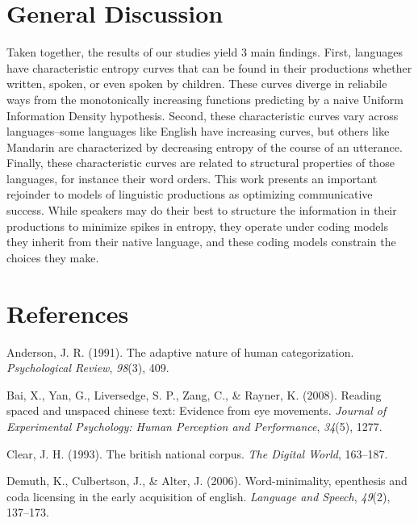 \documentclass[10pt, letterpaper]{article}
\begin{document}
\hypertarget{general-discussion}{%
\section{General Discussion}\label{general-discussion}}

Taken together, the results of our studies yield 3 main findings. First,
languages have characteristic entropy curves that can be found in their
productions whether written, spoken, or even spoken by children. These
curves diverge in reliabile ways from the monotonically increasing
functions predicting by a naive Uniform Information Density hypothesis.
Second, these characteristic curves vary across languages--some
languages like English have increasing curves, but others like Mandarin
are characterized by decreasing entropy of the course of an utterance.
Finally, these characteristic curves are related to structural
properties of those languages, for instance their word orders. This work
presents an important rejoinder to models of linguistic productions as
optimizing communicative success. While speakers may do their best to
structure the information in their productions to minimize spikes in
entropy, they operate under coding models they inherit from their native
language, and these coding models constrain the choices they make.

\hypertarget{references}{%
\section{References}\label{references}}

\setlength{\parindent}{-0.1in} 
\setlength{\leftskip}{0.125in}

\noindent

\hypertarget{refs}{}
\leavevmode\hypertarget{ref-anderson1991}{}%
Anderson, J. R. (1991). The adaptive nature of human categorization.
\emph{Psychological Review}, \emph{98}(3), 409.

\leavevmode\hypertarget{ref-bai2008}{}%
Bai, X., Yan, G., Liversedge, S. P., Zang, C., \& Rayner, K. (2008).
Reading spaced and unspaced chinese text: Evidence from eye movements.
\emph{Journal of Experimental Psychology: Human Perception and
Performance}, \emph{34}(5), 1277.

\leavevmode\hypertarget{ref-clear1993}{}%
Clear, J. H. (1993). The british national corpus. \emph{The Digital
World}, 163--187.

\leavevmode\hypertarget{ref-demuth2006}{}%
Demuth, K., Culbertson, J., \& Alter, J. (2006). Word-minimality,
epenthesis and coda licensing in the early acquisition of english.
\emph{Language and Speech}, \emph{49}(2), 137--173.
\end{document}
